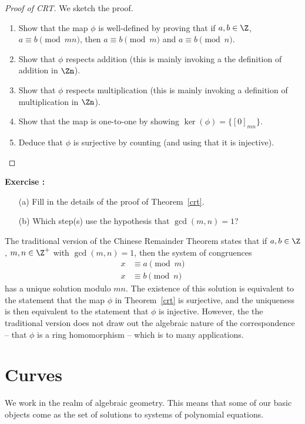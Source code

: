 \documentclass[12pt]{amsart}
\newcounter{probs}
\newenvironment{prob}{%
  \refstepcounter{probs}
  \par\medskip\noindent\textbf{Exercise \theprobs:} }{\par\medskip}
\theoremstyle{plain}
\theoremstyle{definition}
\theoremstyle{remark}
\begin{document}
\begin{proof}[Proof of CRT]
  We sketch the proof.
  \begin{enumerate}
  \item Show that the map $\phi$ is well-defined by proving that if $a,b\in\Z$,
    $a\equiv b\pmod{mn}$, then $a\equiv b\pmod m$ and $a\equiv b\pmod
    n$.
  \item Show that $\phi$ respects addition (this is mainly invoking a 
    the definition of addition in $\Zn$).
  \item Show that $\phi$ respects multiplication (this is mainly invoking a 
    definition of multiplication in $\Zn$).
  \item Show that the map is one-to-one by showing $\ker(\phi) =
    \{[0]_{mn}\}$.
  \item Deduce that $\phi$ is surjective by counting (and using that
    it is injective).
  \end{enumerate}
\end{proof}
\begin{prob}
  \begin{enumerate}
  \item[(a)]  Fill in the details of the proof of Theorem~\ref{crt}.  
  \item[(b)] Which  step(s) use the hypothesis that $\gcd(m,n)=1$?
  \end{enumerate}
\end{prob}
The traditional version of the Chinese Remainder Theorem states that
if $a,b\in\Z$, $m,n\in\Z^+$ with $\gcd(m,n)=1$, then the system of
congruences 
\begin{align*}
x&\equiv a \pmod m \\
x &\equiv b\pmod n
\end{align*} 
has a unique solution modulo $mn$.  The existence of this solution is
equivalent to the statement that the map $\phi$ in Theorem~\ref{crt}
is surjective, and the uniqueness is then equivalent to the statement
that $\phi$ is injective.  However, the the traditional version
does not draw out the algebraic nature of the correspondence -- that
$\phi$ is a ring homomorphism -- which is to many applications.






\section{Curves}
We work in the realm of algebraic geometry.  This means that some of
our basic objects come as the set of solutions to systems of
polynomial equations.
\end{document}
